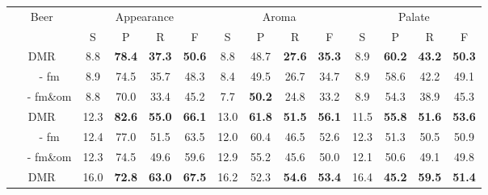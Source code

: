 \documentclass[letterpaper]{article} %
\begin{document}
\begin{table*}[!t]
\centering
\vspace{0.5cm}
\small
\begin{tabular}{c|cccc|cccc|cccc}
\hline%
\multicolumn{1}{c|}{\multirow{2}{*}{Beer}} & \multicolumn{4}{c|}{Appearance}                               & \multicolumn{4}{c|}{Aroma}                                    & \multicolumn{4}{c}{Palate}                           \\
\multicolumn{1}{c|}{}                      & S    & P             & R             & \multicolumn{1}{c|}{F} & S    & P             & R             & \multicolumn{1}{c|}{F} & S    & P             & R             & F             \\ \hline
DMR                                        & 8.8  & \textbf{78.4} & \textbf{37.3} & \textbf{50.6}          & 8.8  & 48.7          & \textbf{27.6} & \textbf{35.3}          & 8.9  & \textbf{60.2} & \textbf{43.2} & \textbf{50.3} \\ 
~~ - fm                                 & 8.9  & 74.5          & 35.7          & 48.3                   & 8.4  & 49.5          & 26.7          & 34.7                   & 8.9  & 58.6          & 42.2          & 49.1          \\
~~ - fm\&om                           & 8.8  & 70.0          & 33.4          & 45.2                   & 7.7  & \textbf{50.2} & 24.8          & 33.2                   & 8.9  & 54.3          & 38.9          & 45.3          \\ \hline
DMR                                        & 12.3 & \textbf{82.6} & \textbf{55.0} & \textbf{66.1}          & 13.0 & \textbf{61.8} & \textbf{51.5} & \textbf{56.1}          & 11.5 & \textbf{55.8} & \textbf{51.6} & \textbf{53.6} \\ 
~~ - fm                                 & 12.4 & 77.0          & 51.5          & 63.5                   & 12.0 & 60.4          & 46.5          & 52.6                   & 12.3 & 51.3          & 50.5          & 50.9          \\
~~ - fm\&om                           & 12.3 & 74.5          & 49.6          & 59.6                   & 12.9 & 55.2          & 45.6          & 50.0                   & 12.1 & 50.6          & 49.1          & 49.8          \\\hline
DMR                                        & 16.0 & \textbf{72.8} & \textbf{63.0} & \textbf{67.5}          & 16.2 & 52.3          & \textbf{54.6} & \textbf{53.4}          & 16.4 & \textbf{45.2} & \textbf{59.5} & \textbf{51.4} \\ 

\end{tabular}
\end{table*}
\end{document}
